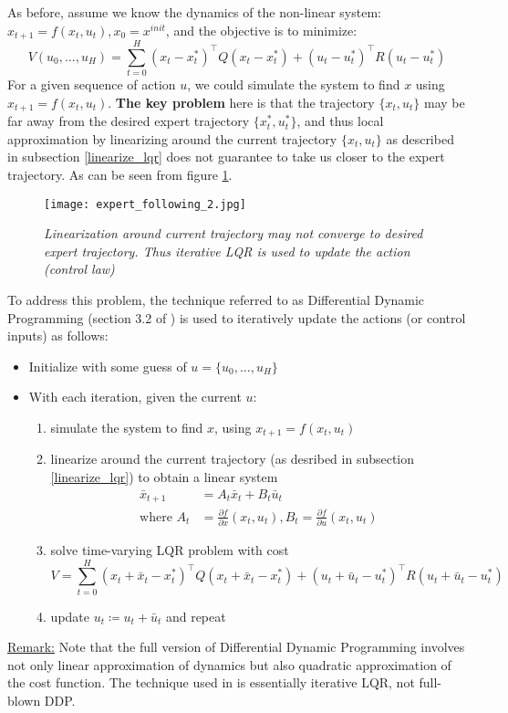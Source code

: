 \documentclass[a4paper]{article}
\begin{document}
As before, assume we know the dynamics of the non-linear system: $x_{t+1} = f(x_t,u_t), x_0 = x^{init}$, and the objective is to minimize:
\begin{equation}
V(u_0,\ldots,u_H) = \sum_{t=0}^H (x_t-x^*_t)^\intercal Q (x_t-x^*_t) + (u_t-u^*_t)^\intercal R(u_t-u^*_t)
\end{equation}
For a given sequence of action $u$, we could simulate the system to find $x$ using $x_{t+1} = f(x_t,u_t)$. \textbf{The key problem} here is that the trajectory $\{x_t,u_t\}$ may be far away from the desired expert trajectory $\{x^*_t,u^*_t\}$, and thus local approximation by linearizing around the current trajectory $\{x_t,u_t\}$ as described in subsection \ref{linearize_lqr} does not guarantee to take us closer to the expert trajectory. As can be seen from figure \ref{fig:expert_following}.
\begin{figure}[h]
	\centering
	\texttt{[image: expert\_following\_2.jpg]}
	\caption{\textit{Linearization around current trajectory may not converge to desired expert trajectory. Thus iterative LQR is used to update the action (control law)}}
	\label{fig:expert_following}
\end{figure}
To address this problem, the technique referred to as Differential Dynamic Programming (section 3.2 of \cite{abbeel2007application}) is used to iteratively update the actions (or control inputs) as follows:
\begin{itemize}
\item Initialize with some guess of $u = \{u_0,\ldots,u_H\}$
\item With each iteration, given the current $u$:
\begin{enumerate}
\item simulate the system to find $x$, using $x_{t+1} = f(x_t,u_t)$
\item linearize around the current trajectory (as desribed in subsection \ref{linearize_lqr}) to obtain a linear system
\begin{align}
\bar{x}_{t+1} &= A_t\bar{x}_t + B_t\bar{u}_t \\
\text{where } A_t &= \frac{\partial f}{\partial x}(x_t,u_t), B_t = \frac{\partial f}{\partial u}(x_t,u_t)
\end{align}
\item solve time-varying LQR problem with cost
\begin{equation}
V = \sum_{t=0}^H (x_t+\bar{x}_t - x^*_t)^\intercal Q (x_t+\bar{x}_t - x^*_t) + (u_t+\bar{u}_t - u^*_t)^\intercal R (u_t+\bar{u}_t - u^*_t)
\end{equation}
\item update $u_t\coloneqq u_t+\bar{u}_t$ and repeat
\end{enumerate}
\end{itemize}
\underline{Remark:} Note that the full version of Differential Dynamic Programming involves not only linear approximation of dynamics but also quadratic approximation of the cost function. The technique used in \cite{abbeel2007application} is essentially iterative LQR, not full-blown DDP.
\end{document}
